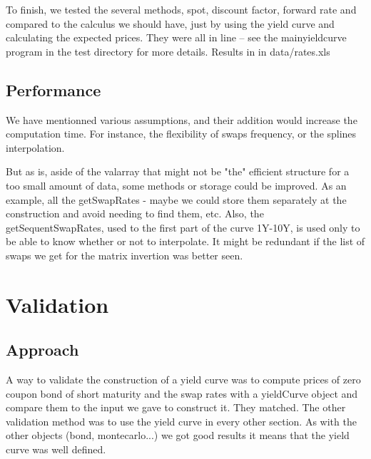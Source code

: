 \par To finish, we tested the several methods, spot, discount factor, forward rate and compared to the calculus we should have, just by using the yield curve and calculating the expected prices. They were all in line -- see the mainyieldcurve program in the test directory for more details. Results in in data/rates.xls

\subsection{Performance}

\par We have mentionned various assumptions, and their addition would increase the computation time. For instance, the flexibility of swaps frequency, or the splines interpolation.

\par But as is, aside of the valarray that might not be "the" efficient structure for a too small amount of data, some methods or storage could be improved. As an example, all the getSwapRates - maybe we could store them separately at the construction and avoid needing to find them, etc.
Also, the getSequentSwapRates, used to the first part of the curve 1Y-10Y, is used only to be able to know whether or not to interpolate. It might be redundant if the list of swaps we get for the matrix invertion was better seen.



\section{Validation}


\subsection{Approach}
A way to validate the construction of a yield curve was to compute prices of zero coupon bond of short maturity and the swap rates with a yieldCurve object and compare them to the input we gave to construct it. They matched.
The other validation method was to use the yield curve in every other section. As with the other objects (bond, montecarlo...) we got good results it means that the yield curve was well defined.

